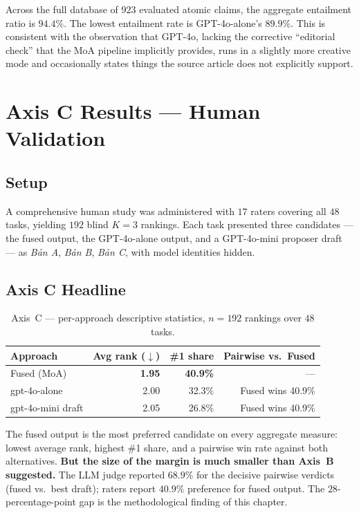 Across the full database of $923$ evaluated atomic claims, the aggregate entailment ratio is $94.4\%$. The lowest entailment rate is GPT-4o-alone's $89.9\%$. This is
consistent with the observation that GPT-4o, lacking the corrective
``editorial check'' that the MoA pipeline implicitly provides, runs
in a slightly more creative mode and occasionally states things the
source article does not explicitly support.

\section{Axis C Results --- Human Validation}

\subsection{Setup}

A comprehensive human study was administered with $17$ raters covering all
$48$ tasks, yielding $192$ blind $K = 3$ rankings. Each task
presented three candidates --- the fused output, the GPT-4o-alone
output, and a GPT-4o-mini proposer draft --- as \textit{Bản A},
\textit{Bản B}, \textit{Bản C}, with model identities hidden.



\subsection{Axis C Headline}

\begin{table}[H]
  \centering
  \caption{Axis~C --- per-approach descriptive statistics, $n = 192$
  rankings over $48$ tasks.}
  \label{tab:axisC}
  \begin{tabular}{lrrr}
    \toprule
    Approach & Avg rank ($\downarrow$) & \#1 share & Pairwise vs.\ Fused \\
    \midrule
    Fused (MoA)      & \textbf{1.95} & \textbf{40.9\%} & --- \\
    gpt-4o-alone     & 2.00 & 32.3\% & Fused wins 40.9\% \\
    gpt-4o-mini draft & 2.05 & 26.8\% & Fused wins 40.9\% \\
    \bottomrule
  \end{tabular}
\end{table}

The fused output is the most preferred candidate on every aggregate
measure: lowest average rank, highest \#1 share, and a pairwise win
rate against both alternatives. \textbf{But the size of
the margin is much smaller than Axis~B suggested.} The LLM judge
reported $68.9\%$ for the decisive pairwise verdicts (fused vs.\ best draft);
raters report $40.9\%$ preference for fused output. The $28$-percentage-point gap is the
methodological finding of this chapter.

